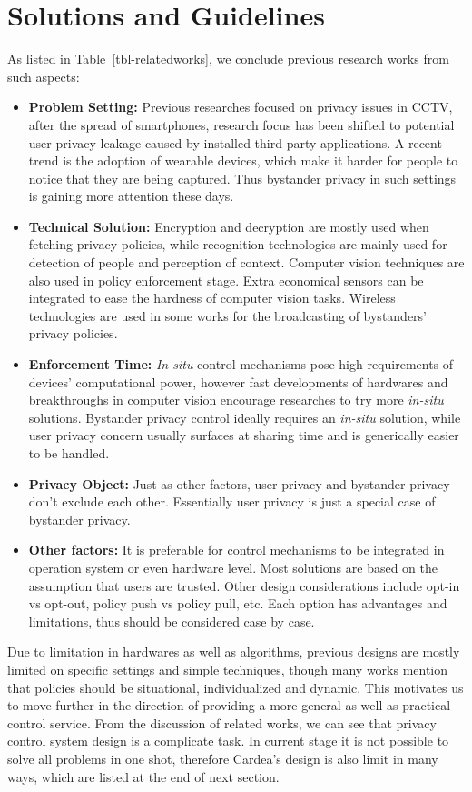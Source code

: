 \section{Solutions and Guidelines}
As listed in Table~\ref{tbl-relatedworks}, we conclude previous research works from such aspects:

\begin{itemize}
  \item {\bf Problem Setting:} Previous researches focused on privacy issues in CCTV, after the spread of smartphones, research focus has been shifted to potential user privacy leakage caused by installed third party applications. A recent trend is the adoption of wearable devices, which make it harder for people to notice that they are being captured. Thus bystander privacy in such settings is gaining more attention these days.
  \item {\bf Technical Solution:} Encryption and decryption are mostly used when fetching privacy policies, while recognition technologies are mainly used for detection of people and perception of context. Computer vision techniques are also used in policy enforcement stage. Extra economical sensors can be integrated to ease the hardness of computer vision tasks. Wireless technologies are used in some works for the broadcasting of bystanders' privacy policies.
  \item {\bf Enforcement Time:} \emph{In-situ} control mechanisms pose high requirements of devices' computational power, however fast developments of hardwares and breakthroughs in computer vision encourage researches to try more \emph{in-situ} solutions. Bystander privacy control ideally requires an \emph{in-situ} solution, while user privacy concern usually surfaces at sharing time and is generically easier to be handled.
  \item {\bf Privacy Object:} Just as other factors, user privacy and bystander privacy don't exclude each other. Essentially user privacy is just a special case of bystander privacy.
  \item {\bf Other factors:} It is preferable for control mechanisms to be integrated in operation system or even hardware level. Most solutions are based on the assumption that users are trusted. Other design considerations include opt-in vs opt-out, policy push vs policy pull, etc. Each option has advantages and limitations, thus should be considered case by case.
\end{itemize}

Due to limitation in hardwares as well as algorithms, previous designs are mostly limited on specific settings and simple techniques, though many works mention that policies should be situational, individualized and dynamic. This motivates us to move further in the direction of providing a more general as well as practical control service. From the discussion of related works, we can see that privacy control system design is a complicate task. In current stage it is not possible to solve all problems in one shot, therefore Cardea's design is also limit in many ways, which are listed at the end of next section.

